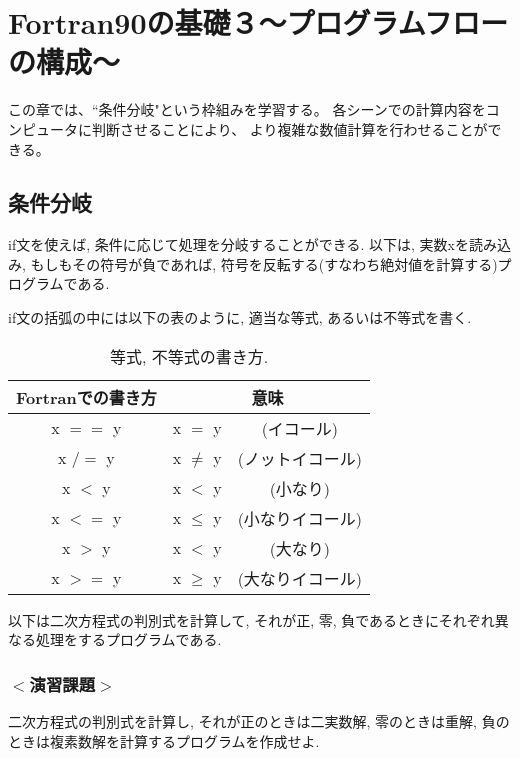 \chapter{Fortran90の基礎３〜プログラムフローの構成〜}
この章では、``条件分岐"という枠組みを学習する。
各シーンでの計算内容をコンピュータに判断させることにより、
より複雑な数値計算を行わせることができる。

\section{条件分岐}
{\ttfamily if}文を使えば, 条件に応じて処理を分岐することができる.
以下は, 実数xを読み込み, もしもその符号が負であれば,
符号を反転する(すなわち絶対値を計算する)プログラムである.

{\ttfamily if}文の括弧の中には以下の表のように, 適当な等式, あるいは不等式を書く.

\begin{table}[h]
  \caption{等式, 不等式の書き方. }
  \begin{center}
    \begin{tabular}{ccc}
      \hline
      Fortranでの書き方   & \multicolumn{2}{c}{意味} \\ \hline
      x $==$ y   & x $=$ y &(イコール)\\
      x $/=$ y   & x $\ne$ y &(ノットイコール)\\
      x $<$ y   & x $<$ y &(小なり)\\
      x $<=$ y  & x $\le$ y &(小なりイコール)\\
      x $>$ y  & x $<$ y &(大なり)\\
      x $>=$ y   & x $\ge$ y &(大なりイコール)\\ \hline
    \end{tabular}
  \end{center}
\end{table}


以下は二次方程式の判別式を計算して, それが正, 零, 負であるときにそれぞれ異なる処理をするプログラムである.


\subsection*{$<$演習課題$>$}
二次方程式の判別式を計算し, それが正のときは二実数解,
零のときは重解, 負のときは複素数解を計算するプログラムを作成せよ.

